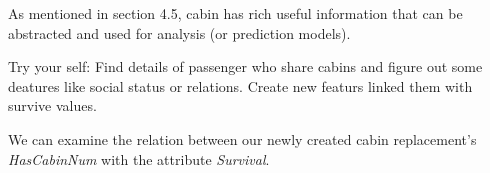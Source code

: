 \documentclass[
]{book}
\makeatletter
\newenvironment{Shaded}{\begin{snugshade}}{\end{snugshade}}
\newcommand{\CommentTok}[1]{\textcolor[rgb]{0.56,0.35,0.01}{\textit{#1}}}
\newcommand{\KeywordTok}[1]{\textcolor[rgb]{0.13,0.29,0.53}{\textbf{#1}}}
\newcommand{\NormalTok}[1]{#1}
\newcommand{\OperatorTok}[1]{\textcolor[rgb]{0.81,0.36,0.00}{\textbf{#1}}}
\newcommand{\StringTok}[1]{\textcolor[rgb]{0.31,0.60,0.02}{#1}}
\newenvironment{kframe}{%
\medskip{}
\setlength{\fboxsep}{.8em}
 \def\at@end@of@kframe{}%
 \ifinner\ifhmode%
  \def\at@end@of@kframe{\end{minipage}}%
  \begin{minipage}{\columnwidth}%
 \fi\fi%
 \def\FrameCommand##1{\hskip\@totalleftmargin \hskip-\fboxsep
 \colorbox{shadecolor}{##1}\hskip-\fboxsep
     \hskip-\linewidth \hskip-\@totalleftmargin \hskip\columnwidth}%
 \MakeFramed {\advance\hsize-\width
   \@totalleftmargin\z@ \linewidth\hsize
   \@setminipage}}%
 {\par\unskip\endMakeFramed%
 \at@end@of@kframe}
\newenvironment{rmdblock}[1]
  {
  \begin{itemize}
  \renewcommand{\labelitemi}{
    \raisebox{-.7\height}[0pt][0pt]{
      {\setkeys{Gin}{width=3em,keepaspectratio}\texttt{[image: images/\#1]}}
    }
  }
  \setlength{\fboxsep}{1em}
  \begin{kframe}
  \item
  }
  {
  \end{kframe}
  \end{itemize}
  }
\newenvironment{rmdaction}
  {\begin{rmdblock}{action}}
  {\end{rmdblock}}
\makeatother
\begin{document}
As mentioned in section 4.5, cabin has rich useful information that can be abstracted and used for analysis (or prediction models).

\begin{rmdaction}
Try your self:
Find details of passenger who share cabins and figure out some deatures like social status or relations. Create new featurs linked them with survive values.\\
\end{rmdaction}

\begin{Shaded}
\end{Shaded}

We can examine the relation between our newly created cabin replacement's \emph{HasCabinNum} with the attribute \emph{Survival}.
\end{document}
